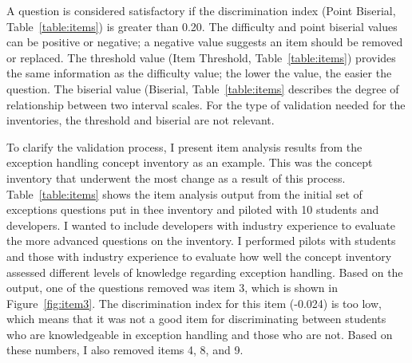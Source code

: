 A question is considered satisfactory if the discrimination index (Point Biserial, Table~\ref{table:items}) is greater than 0.20. The difficulty and point biserial values can be positive or negative; a negative value suggests an item should be removed or replaced.
The threshold value (Item Threshold, Table~\ref{table:items}) provides the same information as the difficulty value; the lower the value, the easier the question. 
The biserial value (Biserial, Table~\ref{table:items} describes the degree of relationship between two interval scales. For the type of validation needed for the inventories, the threshold and biserial are not relevant.


To clarify the validation process, I present item analysis results from the exception handling concept inventory as an example. This was the concept inventory that underwent the most change as a result of this process. Table~\ref{table:items} shows the item analysis output from the initial set of exceptions questions put in thee inventory and piloted with 10 students and developers. I wanted to include developers with industry experience to evaluate the more advanced questions on the inventory. I performed pilots with students and those with industry experience to evaluate how well the concept inventory assessed different levels of knowledge regarding exception handling. Based on the output, one of the questions removed was item 3, which is shown in Figure~\ref{fig:item3}. The discrimination index for this item (-0.024) is too low, which means that it was not a good item for discriminating between students who are knowledgeable in exception handling and those who are not. Based on these numbers, I also removed items 4, 8, and 9.

